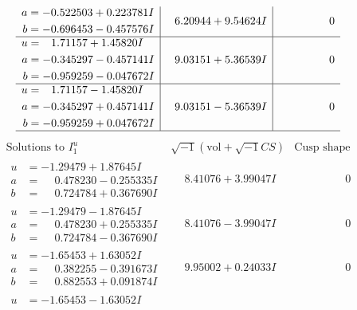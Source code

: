 \documentclass[1p]{elsarticle_modified}
\theoremstyle{definition}
\newcommand{\I}{\sqrt{-1}}
\begin{document}
$$\begin{array}{c|c|c}
\begin{aligned}
a &= -0.522503 + 0.223781 I \\
b &= -0.696453 - 0.457576 I\end{aligned}
 & \phantom{-}6.20944 + 9.54624 I & \phantom{-0.000000 } 0 \\ \hline\begin{aligned}
u &= \phantom{-}1.71157 + 1.45820 I \\
a &= -0.345297 - 0.457141 I \\
b &= -0.959259 - 0.047672 I\end{aligned}
 & \phantom{-}9.03151 + 5.36539 I & \phantom{-0.000000 } 0 \\ \hline\begin{aligned}
u &= \phantom{-}1.71157 - 1.45820 I \\
a &= -0.345297 + 0.457141 I \\
b &= -0.959259 + 0.047672 I\end{aligned}
 & \phantom{-}9.03151 - 5.36539 I & \phantom{-0.000000 } 0\\
 \hline 
 \end{array}$$\newpage$$\begin{array}{c|c|c}  
\text{Solutions to }I^u_{1}& \I (\text{vol} + \sqrt{-1}CS) & \text{Cusp shape}\\
 \hline 
\begin{aligned}
u &= -1.29479 + 1.87645 I \\
a &= \phantom{-}0.478230 - 0.255335 I \\
b &= \phantom{-}0.724784 + 0.367690 I\end{aligned}
 & \phantom{-}8.41076 + 3.99047 I & \phantom{-0.000000 } 0 \\ \hline\begin{aligned}
u &= -1.29479 - 1.87645 I \\
a &= \phantom{-}0.478230 + 0.255335 I \\
b &= \phantom{-}0.724784 - 0.367690 I\end{aligned}
 & \phantom{-}8.41076 - 3.99047 I & \phantom{-0.000000 } 0 \\ \hline\begin{aligned}
u &= -1.65453 + 1.63052 I \\
a &= \phantom{-}0.382255 - 0.391673 I \\
b &= \phantom{-}0.882553 + 0.091874 I\end{aligned}
 & \phantom{-}9.95002 + 0.24033 I & \phantom{-0.000000 } 0 \\ \hline\begin{aligned}
u &= -1.65453 - 1.63052 I \\

\end{aligned}
\end{array}$$
\end{document}
